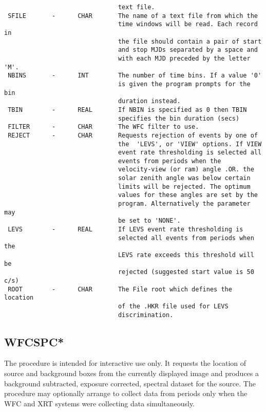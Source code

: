 \documentclass{book}
\renewcommand{\_}{{\tt\char'137}}     %
\begin{document}
\begin{verbatim}
                               text file.
 SFILE       -      CHAR       The name of a text file from which the
                               time windows will be read. Each record in
                               the file should contain a pair of start
                               and stop MJDs separated by a space and
                               with each MJD preceded by the letter 'M'.
 NBINS       -      INT        The number of time bins. If a value '0'
                               is given the program prompts for the bin
                               duration instead.
 TBIN        -      REAL       If NBIN is specified as 0 then TBIN
                               specifies the bin duration (secs)
 FILTER      -      CHAR       The WFC filter to use.
 REJECT      -      CHAR       Requests rejection of events by one of
                               the  'LEVS', or 'VIEW' options. If VIEW
                               event rate thresholding is selected all
                               events from periods when the
                               velocity-view (or ram) angle .OR. the
                               solar zenith angle was below certain
                               limits will be rejected. The optimum
                               values for these angles are set by the
                               program. Alternatively the parameter may
                               be set to 'NONE'.
 LEVS        -      REAL       If LEVS event rate thresholding is
                               selected all events from periods when the
                               LEVS rate exceeds this threshold will be
                               rejected (suggested start value is 50 c/s)
 ROOT        -      CHAR       The File root which defines the location
                               of the .HKR file used for LEVS
                               discrimination.
\end{verbatim}\subsection{WFCSPC*}
The procedure is intended for interactive use only. It requests the
location of source and background boxes from the currently displayed
image and produces a background subtracted, exposure corrected, spectral
dataset for the source.
The procedure may optionally arrange to collect data from periods only
when the WFC and XRT systems were collecting data simultaneously.
 
\end{document}

